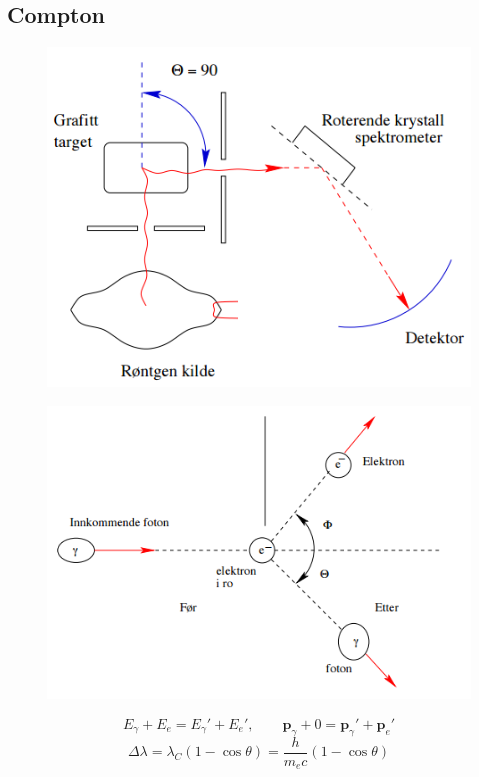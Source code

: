 \documentclass[a4paper,norsk, 10pt]{article}
\begin{document}
\subsection{Compton}
\begin{figure}[H]
\centering
\includegraphics[scale=0.2]{compton.png}
\end{figure}
\begin{figure}[H]
\centering
\includegraphics[scale=0.2]{compton2.png}
\end{figure}
\begin{equation}
E_{\gamma} + E_e = E_{\gamma}' + E_e', \qquad \mathbf{p}_{\gamma} + 0 = \mathbf{p}_{\gamma}' + \mathbf{p}_{e}'
\end{equation}
\begin{equation}
\Delta \lambda = \lambda_C(1-\cos\theta) = \frac{h}{m_ec}(1-\cos\theta)
\end{equation}
\end{document}
